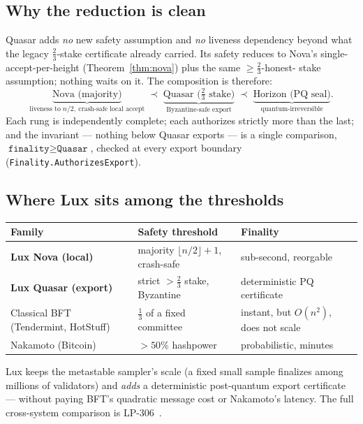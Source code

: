 \documentclass[11pt,a4paper]{article}
\begin{document}
\subsection{Why the reduction is clean}

Quasar adds \emph{no} new safety assumption and \emph{no} liveness dependency beyond what the
legacy \(\tfrac{2}{3}\)-stake certificate already carried. Its safety reduces to Nova's
single-accept-per-height (Theorem~\ref{thm:nova}) plus the same \(\ge\tfrac{2}{3}\)-honest-
stake assumption; nothing waits on it. The composition is therefore:
\[
\underbrace{\text{Nova (majority)}}_{\text{liveness to }n/2,\ \text{crash-safe local accept}}
\;\prec\;
\underbrace{\text{Quasar (}\tfrac{2}{3}\text{ stake)}}_{\text{Byzantine-safe export}}
\;\prec\;
\underbrace{\text{Horizon (PQ seal)}}_{\text{quantum-irreversible}} .
\]
Each rung is independently complete; each authorizes strictly more than the last; and the
invariant --- nothing below Quasar exports --- is a single comparison, \(\texttt{finality}
\ge \texttt{Quasar}\), checked at every export boundary (\texttt{Finality.AuthorizesExport}).

\subsection{Where Lux sits among the thresholds}

\begin{center}
\begin{tabular}{@{}l l l@{}}
\toprule
\textbf{Family} & \textbf{Safety threshold} & \textbf{Finality} \\
\midrule
\textbf{Lux Nova (local)}   & majority \(\lfloor n/2\rfloor+1\), crash-safe & sub-second, reorgable \\
\textbf{Lux Quasar (export)}& strict \(>\tfrac{2}{3}\) stake, Byzantine     & deterministic PQ certificate \\
Classical BFT (Tendermint, HotStuff) & \(\tfrac{1}{3}\) of a fixed committee & instant, but \(O(n^2)\), does not scale \\
Nakamoto (Bitcoin)          & \(>\!50\%\) hashpower                          & probabilistic, minutes \\
\bottomrule
\end{tabular}
\end{center}

Lux keeps the metastable sampler's scale (a fixed small sample finalizes among millions of
validators) and \emph{adds} a deterministic post-quantum export certificate --- without
paying BFT's quadratic message cost or Nakamoto's latency. The full cross-system comparison is
LP-306~\cite{lp306}.
\end{document}
